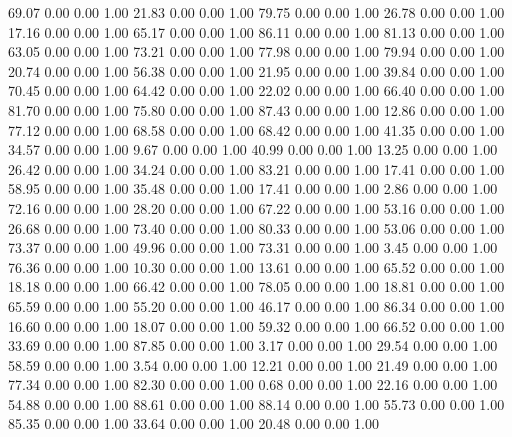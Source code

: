    69.07   0.00   0.00   1.00
   21.83   0.00   0.00   1.00
   79.75   0.00   0.00   1.00
   26.78   0.00   0.00   1.00
   17.16   0.00   0.00   1.00
   65.17   0.00   0.00   1.00
   86.11   0.00   0.00   1.00
   81.13   0.00   0.00   1.00
   63.05   0.00   0.00   1.00
   73.21   0.00   0.00   1.00
   77.98   0.00   0.00   1.00
   79.94   0.00   0.00   1.00
   20.74   0.00   0.00   1.00
   56.38   0.00   0.00   1.00
   21.95   0.00   0.00   1.00
   39.84   0.00   0.00   1.00
   70.45   0.00   0.00   1.00
   64.42   0.00   0.00   1.00
   22.02   0.00   0.00   1.00
   66.40   0.00   0.00   1.00
   81.70   0.00   0.00   1.00
   75.80   0.00   0.00   1.00
   87.43   0.00   0.00   1.00
   12.86   0.00   0.00   1.00
   77.12   0.00   0.00   1.00
   68.58   0.00   0.00   1.00
   68.42   0.00   0.00   1.00
   41.35   0.00   0.00   1.00
   34.57   0.00   0.00   1.00
    9.67   0.00   0.00   1.00
   40.99   0.00   0.00   1.00
   13.25   0.00   0.00   1.00
   26.42   0.00   0.00   1.00
   34.24   0.00   0.00   1.00
   83.21   0.00   0.00   1.00
   17.41   0.00   0.00   1.00
   58.95   0.00   0.00   1.00
   35.48   0.00   0.00   1.00
   17.41   0.00   0.00   1.00
    2.86   0.00   0.00   1.00
   72.16   0.00   0.00   1.00
   28.20   0.00   0.00   1.00
   67.22   0.00   0.00   1.00
   53.16   0.00   0.00   1.00
   26.68   0.00   0.00   1.00
   73.40   0.00   0.00   1.00
   80.33   0.00   0.00   1.00
   53.06   0.00   0.00   1.00
   73.37   0.00   0.00   1.00
   49.96   0.00   0.00   1.00
   73.31   0.00   0.00   1.00
    3.45   0.00   0.00   1.00
   76.36   0.00   0.00   1.00
   10.30   0.00   0.00   1.00
   13.61   0.00   0.00   1.00
   65.52   0.00   0.00   1.00
   18.18   0.00   0.00   1.00
   66.42   0.00   0.00   1.00
   78.05   0.00   0.00   1.00
   18.81   0.00   0.00   1.00
   65.59   0.00   0.00   1.00
   55.20   0.00   0.00   1.00
   46.17   0.00   0.00   1.00
   86.34   0.00   0.00   1.00
   16.60   0.00   0.00   1.00
   18.07   0.00   0.00   1.00
   59.32   0.00   0.00   1.00
   66.52   0.00   0.00   1.00
   33.69   0.00   0.00   1.00
   87.85   0.00   0.00   1.00
    3.17   0.00   0.00   1.00
   29.54   0.00   0.00   1.00
   58.59   0.00   0.00   1.00
    3.54   0.00   0.00   1.00
   12.21   0.00   0.00   1.00
   21.49   0.00   0.00   1.00
   77.34   0.00   0.00   1.00
   82.30   0.00   0.00   1.00
    0.68   0.00   0.00   1.00
   22.16   0.00   0.00   1.00
   54.88   0.00   0.00   1.00
   88.61   0.00   0.00   1.00
   88.14   0.00   0.00   1.00
   55.73   0.00   0.00   1.00
   85.35   0.00   0.00   1.00
   33.64   0.00   0.00   1.00
   20.48   0.00   0.00   1.00
